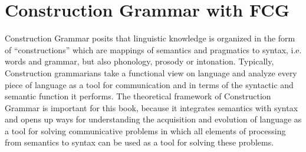 %

\chapter{Construction Grammar with FCG}
\label{s:fcg}
Construction Grammar posits that  linguistic
knowledge is organized in the form of ``constructions'' \citep{goldberg1995constructions,croft2001radical}
which are mappings of semantics and pragmatics to syntax, 
i.e. words and grammar, but also phonology, prosody or intonation. 
Typically, Construction grammarians take a functional view on language
and analyze every piece of language as a tool for communication and 
in terms of the syntactic and semantic function it performs.
The theoretical framework of Construction Grammar
is important for this book, because it integrates 
semantics with syntax and opens up 
ways for understanding the acquisition and evolution
of language as a tool for solving communicative problems 
in which all elements of processing from semantics to
syntax can be used as a tool for solving these
problems. 

